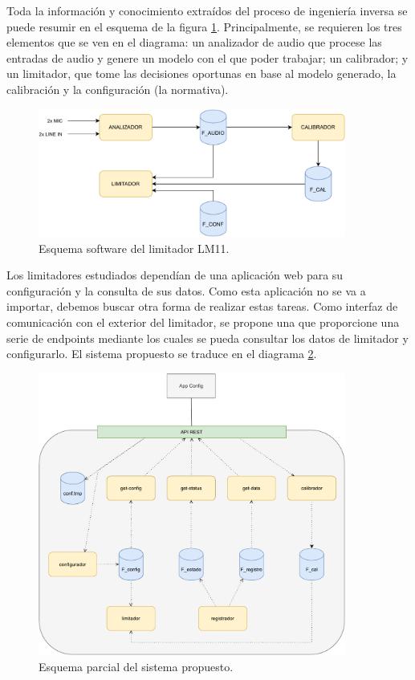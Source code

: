 Toda la información y conocimiento extraídos del proceso de ingeniería inversa se puede resumir en el esquema de la figura \ref{fig:lms11-software}. Principalmente, se requieren los tres elementos que se ven en el diagrama: un analizador de audio que procese las entradas de audio y genere un modelo con el que poder trabajar; un calibrador; y un limitador, que tome las decisiones oportunas en base al modelo generado, la calibración y la configuración (la normativa).

\begin{figure}[h]
    \centering
    \includegraphics[width=0.9\textwidth]{figuras/lms11-esquema-software.pdf}
    \caption{Esquema software del limitador \acrshort{LM11}.}
    \label{fig:lms11-software}
\end{figure}


Los limitadores estudiados dependían de una aplicación web para su configuración y la consulta de sus datos. Como esta aplicación no se va a importar, debemos buscar otra forma de realizar estas tareas. Como interfaz de comunicación con el exterior del limitador, se propone una  que proporcione una serie de endpoints mediante los cuales se pueda consultar los datos de limitador y configurarlo. El sistema propuesto se traduce en el diagrama \ref{fig:lms11-overview}.

\begin{figure}[h]
    \centering
    \includegraphics[width=0.9\textwidth]{figuras/lms11-overview.pdf}
    \caption{Esquema parcial del sistema propuesto.}
    \label{fig:lms11-overview}
\end{figure}

